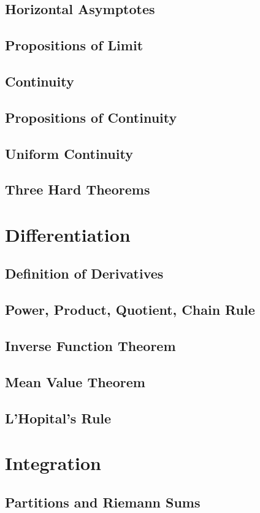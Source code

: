 \documentclass{book}
\begin{document}
\section{Horizontal Asymptotes}
\section{Propositions of Limit}
\section{Continuity}
\section{Propositions of Continuity}
\section{Uniform Continuity}
\section{Three Hard Theorems}

\chapter{Differentiation}
\section{Definition of Derivatives}
\section{Power, Product, Quotient, Chain Rule}
\section{Inverse Function Theorem}
\section{Mean Value Theorem}
\section{L'Hopital's Rule}

\chapter{Integration}
\section{Partitions and Riemann Sums}
\end{document}

